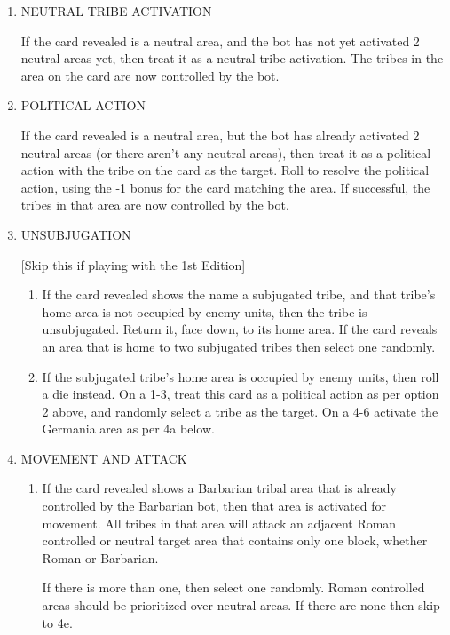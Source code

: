 \renewcommand{\labelenumii}{\alph{enumii}.}
\begin{enumerate}
  \item NEUTRAL TRIBE ACTIVATION

  If the card revealed is a neutral area, and the bot has not yet activated 2 neutral areas yet, then treat it as a neutral tribe activation. The tribes in the area on the card are now controlled by the bot.

  \item POLITICAL ACTION
  
  If the card revealed is a neutral area, but the bot has already activated 2 neutral areas (or there aren't any neutral areas), then treat it as a political action with the tribe on the card as the target. Roll to resolve the political action, using the -1 bonus for the card matching the area. If successful, the tribes in that area are now controlled by the bot.

  \item UNSUBJUGATION
  
  [Skip this if playing with the 1st Edition]
  
  \begin{enumerate}[leftmargin=0in]
    \item If the card revealed shows the name a subjugated tribe, and that tribe's home area is not occupied by enemy units, then the tribe is unsubjugated. Return it, face down, to its home area. If the card reveals an area that is home to two subjugated tribes then select one randomly.

    \item If the subjugated tribe's home area is occupied by enemy units, then roll a die instead. On a 1-3, treat this card as a political action as per option 2 above, and randomly select a tribe as the target. On a 4-6 activate the Germania area as per 4a below.
  \end{enumerate}
  
  \item MOVEMENT AND ATTACK

  \begin{enumerate}[leftmargin=0in]
    \item If the card revealed shows a Barbarian tribal area that is already controlled by the Barbarian bot, then that area is activated for movement. All tribes in that area will attack an adjacent Roman controlled or neutral target area that contains only one block, whether Roman or Barbarian.
    
    If there is more than one, then select one randomly. Roman controlled areas should be prioritized over neutral areas. If there are none then skip to 4e.


\end{enumerate}
\end{enumerate}
